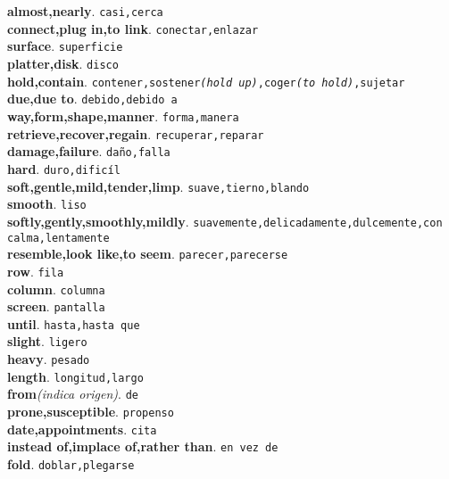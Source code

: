 \documentclass[twocolumn]{article}
\begin{document}
	\textsf{\textbf{almost,nearly}}. \texttt{casi,cerca}\\
	\textsf{\textbf{connect,plug in,to link}}. \texttt{conectar,enlazar}\\
	\textsf{\textbf{surface}}. \texttt{superficie}\\
	\textsf{\textbf{platter,disk}}. \texttt{disco}\\
	\textsf{\textbf{hold,contain}}. \texttt{contener,sostener{\scriptsize \textit{(hold up)}},coger{\scriptsize \textit{(to hold)}},sujetar}\\
	\textsf{\textbf{due,due to}}. \texttt{debido,debido a}\\
	\textsf{\textbf{way,form,shape,manner}}. \texttt{forma,manera}\\
	\textsf{\textbf{retrieve,recover,regain}}. \texttt{recuperar,reparar}\\
	\textsf{\textbf{damage,failure}}. \texttt{da\~no,falla}\\
	\textsf{\textbf{hard}}. \texttt{duro,dific\'il}\\
	\textsf{\textbf{soft,gentle,mild,tender,limp}}. \texttt{suave,tierno,blando}\\
	\textsf{\textbf{smooth}}. \texttt{liso}\\
	\textsf{\textbf{softly,gently,smoothly,mildly}}. \texttt{suavemente,delicadamente,dulcemente,con calma,lentamente}\\
	\textsf{\textbf{resemble,look like,to seem}}. \texttt{parecer,parecerse}\\
	\textsf{\textbf{row}}. \texttt{fila}\\
	\textsf{\textbf{column}}. \texttt{columna}\\
	\textsf{\textbf{screen}}. \texttt{pantalla}\\
	\textsf{\textbf{until}}. \texttt{hasta,hasta que}\\
	\textsf{\textbf{slight}}. \texttt{ligero}\\
	\textsf{\textbf{heavy}}. \texttt{pesado}\\
	\textsf{\textbf{length}}. \texttt{longitud,largo}\\
	\textsf{\textbf{from}}{\scriptsize \textit{(indica origen)}}. \texttt{de}\\
	\textsf{\textbf{prone,susceptible}}. \texttt{propenso}\\
	\textsf{\textbf{date,appointments}}. \texttt{cita}\\
	\textsf{\textbf{instead of,implace of,rather than}}. \texttt{en vez de}\\
	\textsf{\textbf{fold}}. \texttt{doblar,plegarse}\\
\end{document}
